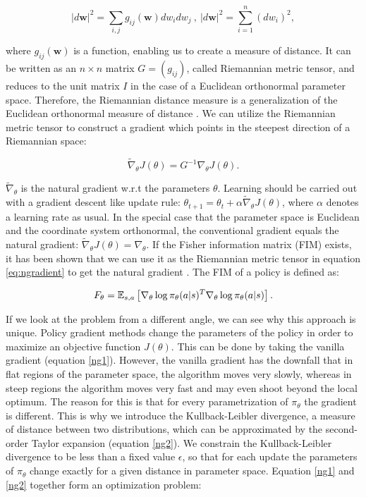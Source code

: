 \begin{equation}
	\label{eq:riem}
	|d\textbf{w}|^2 = \sum_{i,j}g_{ij}(\textbf{w}) dw_i dw_j ~,~ |d\textbf{w}|^2 = \sum_{i=1}^{n}(dw_i)^2,
\end{equation}

\noindent where $g_{ij}(\textbf{w})$ is a function, enabling us to create a measure of distance. It can be written as an $n \times n$ matrix $G = (g_{ij})$, called Riemannian metric tensor, and reduces to the unit matrix $I$ in the case of a Euclidean orthonormal parameter space. Therefore, the Riemannian distance measure is a generalization of the Euclidean orthonormal measure of distance \citep{haykin2009neural, amari1998natural}. We can utilize the Riemannian metric tensor to construct a gradient which points in the steepest direction of a Riemannian space:

\begin{equation}
	\label{eq:ngradient}
	\widetilde{\nabla}_{\theta} J(\theta) = G^{-1} \nabla_\theta J(\theta).
\end{equation}

\noindent $\widetilde{\nabla}_{\theta}$ is the natural gradient w.r.t the parameters $\theta$.  Learning should be carried out with a gradient descent like update rule: $\theta_{t+1} = \theta_{t} + \alpha \widetilde{\nabla}_{\theta} J(\theta)$, where $\alpha$ denotes a learning rate as usual. In the special case that the parameter space is Euclidean and the coordinate system orthonormal, the conventional gradient equals the natural gradient: $\widetilde{\nabla}_{\theta} J(\theta) = \nabla_{\theta}$.
If the Fisher information matrix (FIM) exists, it has been shown that we can use it as the Riemannian metric tensor in equation \ref{eq:ngradient} to get the natural gradient \citep{peters2008natural, amari1998efficiently}. The FIM of a policy is defined as:

\begin{equation}
	F_\theta=\operatorname{\mathbb{E}}_{s,a}\left[\nabla_{\theta}\log\pi_{\theta}(a|s)^{T}\nabla_{\theta}\log\pi_{\theta}(a|s)\right].
\end{equation}

\noindent If we look at the problem from a different angle, we can see why this approach is unique. Policy gradient methods change the parameters of the policy in order to maximize an objective function $J(\theta)$. This can be done by taking the vanilla gradient (equation \ref{ng1}). However, the vanilla gradient has the downfall that in flat regions of the parameter space, the algorithm moves very slowly, whereas in steep regions the algorithm moves very fast and may even shoot beyond the local optimum. The reason for this is that for every parametrization of $\pi_{\theta}$ the gradient is different. This is why we introduce the Kullback-Leibler divergence, a measure of distance between two distributions, which can be approximated by the second-order Taylor expansion (equation \ref{ng2}). We constrain the Kullback-Leibler divergence to be less than a fixed value $\epsilon$, so that for each update the parameters of $\pi_\theta$ change exactly for a given distance in parameter space. Equation \ref{ng1} and \ref{ng2} together form an optimization problem:

